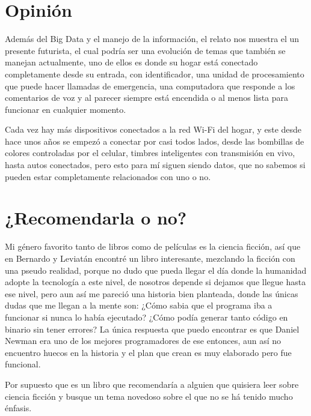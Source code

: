 \documentclass[paper=letter, fontsize=12pt]{scrartcl} %
\begin{document}

\section*{Opinión}

Además del Big Data y el manejo de la información, el relato nos muestra el un presente futurista, el cual podría ser una evolución de temas que también se manejan actualmente, uno de ellos es donde su hogar está conectado completamente desde su entrada, con identificador, una unidad de procesamiento que puede hacer llamadas de emergencia, una computadora que responde a los comentarios de voz y al parecer siempre está encendida o al menos lista para funcionar en cualquier momento.\vspace{4mm}

Cada vez hay más dispositivos conectados a la red Wi-Fi del hogar, y este desde hace unos años se empezó a conectar por casi todos lados, desde las bombillas de colores controladas por el celular, timbres inteligentes con transmisión en vivo, hasta autos conectados, pero esto para mí siguen siendo datos, que no sabemos si pueden estar completamente relacionados con uno o no.


\section*{¿Recomendarla o no?}

Mi género favorito tanto de libros como de películas es la ciencia ficción, así que en Bernardo y Leviatán encontré un libro interesante, mezclando la ficción con una pseudo realidad, porque no dudo que pueda llegar el día donde la humanidad adopte la tecnología a este nivel, de nosotros depende si dejamos que llegue hasta ese nivel, pero aun así me pareció una historia bien planteada, donde las únicas dudas que me llegan a la mente son: ¿Cómo sabia que el programa iba a funcionar si nunca lo había ejecutado? ¿Cómo podía generar tanto código en binario sin tener errores? La única respuesta que puedo encontrar es que Daniel Newman era uno de los mejores programadores de ese entonces, aun así no encuentro huecos en la historia y el plan que crean es muy elaborado pero fue funcional.\vspace{4mm}

Por supuesto que es un libro que recomendaría a alguien que quisiera leer sobre ciencia ficción y busque un tema novedoso sobre el que no se há tenido mucho énfasis.

\end{document}
